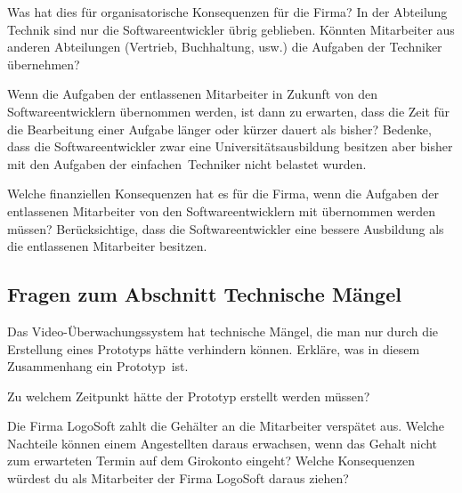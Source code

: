 \begin{compactenum}[a)]
\item Was hat dies für organisatorische Konsequenzen für die Firma? In der
Abteilung Technik sind nur die Softwareentwickler übrig geblieben. Könnten
Mitarbeiter aus anderen Abteilungen (Vertrieb, Buchhaltung, usw.) die Aufgaben
der Techniker übernehmen? 
\item Wenn die Aufgaben der entlassenen Mitarbeiter in Zukunft von den
Softwareentwicklern übernommen werden, ist dann zu erwarten, dass die Zeit für
die Bearbeitung einer Aufgabe länger oder kürzer dauert als bisher? Bedenke,
dass die Softwareentwickler zwar eine Universitätsausbildung besitzen aber
bisher mit den Aufgaben der \glqq einfachen\grqq\ Techniker nicht belastet
wurden.
\item Welche finanziellen Konsequenzen hat es für die Firma, wenn die Aufgaben
der entlassenen Mitarbeiter von den Softwareentwicklern mit übernommen werden
müssen? Berücksichtige, dass die Softwareentwickler eine bessere Ausbildung als
die entlassenen Mitarbeiter besitzen.
\end{compactenum}

\subsection*{Fragen zum Abschnitt \glqq Technische Mängel\grqq}
\begin{compactenum}[a)]
\item Das Video-Überwachungssystem hat technische Mängel, die man nur durch die
Erstellung eines Prototyps hätte verhindern können. Erkläre, was in diesem
Zusammenhang ein \glqq Prototyp\grqq\ ist.
\item Zu welchem Zeitpunkt hätte der Prototyp erstellt werden müssen? 
\item Die Firma LogoSoft zahlt die Gehälter an die Mitarbeiter verspätet aus.
Welche Nachteile können einem Angestellten daraus erwachsen, wenn das Gehalt
nicht zum erwarteten Termin auf dem Girokonto eingeht? Welche Konsequenzen
würdest du als Mitarbeiter der Firma LogoSoft daraus ziehen?
\end{compactenum}

